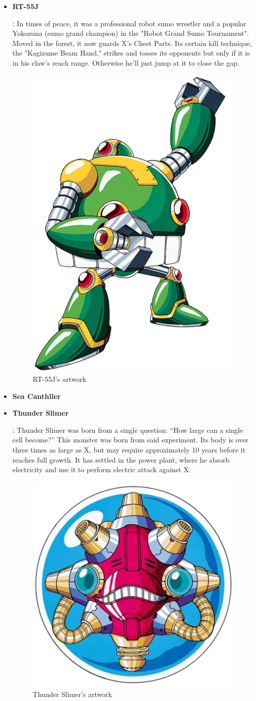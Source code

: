 \begin{itemize}
		\item \hypertarget{miniboss:RT-55J}{\textbf{RT-55J}}: In times of peace, it was a professional robot sumo wrestler and a popular Yokozuna (sumo grand champion) in the "Robot Grand Sumo Tournament". Moved in the forest, it now guards X's  Chest Parts. Its certain kill technique, the "Kagizume Beam Hand," strikes and tosses its opponents but only if it is in his claw's reach range. Otherwise he'll just jump at it to close the gap. 
		\begin{figure}[htp]
			\centering
			\includegraphics[width=0.3\linewidth]{figures/X1/Enemies/RT-55J.jpg}
			\caption{RT-55J's artwork}
		\end{figure}
	
		\item \hypertarget{miniboss:Sea_Canthller}{\textbf{Sea Canthller}}
	
		\item \hypertarget{miniboss:Thunder_Slimer}{\textbf{Thunder Slimer}}: Thunder Slimer was born from a single question: ``How large can a single cell become?'' This monster was born from said experiment. Its body is over three times as large as X, but may require approximately 10 years before it reaches full growth. It has settled in the power plant, where he absorb electricity and use it to perform electric attack against X.
		\begin{figure}[htp]
			\centering
			\includegraphics[width=0.3\linewidth]{figures/X1/Enemies/ThunderSlimer.jpg}
			\caption{Thunder Slimer's artwork}
		\end{figure}
	

\end{itemize}
